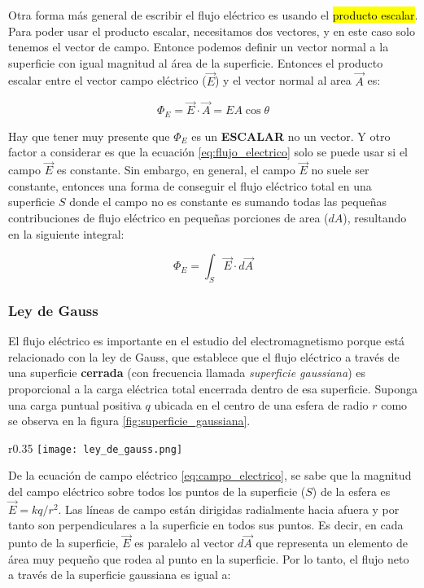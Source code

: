 Otra forma más general de escribir el flujo eléctrico es usando el \hl{producto escalar}. Para poder usar el producto escalar, necesitamos dos vectores, y en este caso solo tenemos el vector de campo. Entonce podemos definir un vector normal a la superficie con igual magnitud al área de la superficie. Entonces el producto escalar entre el vector campo eléctrico (\(\vec{E}\)) y el vector normal al area \(\vec{A}\) es:

\begin{equation}
    \Phi_E = \vec{E} \cdot \vec{A} = E A \cos \theta
    \label{eq:flujo_electrico}
\end{equation}

Hay que tener muy presente que \(\Phi_E\) es un \textbf{ESCALAR} no un vector. Y otro factor a considerar es que la ecuación \eqref{eq:flujo_electrico} solo se puede usar si el campo \(\vec{E}\) es constante. Sin embargo, en general, el campo \(\vec{E}\) no suele ser constante, entonces una forma de conseguir el flujo eléctrico total en una superficie \(S\) donde el campo no es constante es sumando todas las pequeñas contribuciones de flujo eléctrico en pequeñas porciones de area (\(dA\)), resultando en la siguiente integral:

\begin{equation}
    \Phi_E = \int_{S} \vec{E} \cdot d\vec{A}
    \label{eq:flujo_electrico_integral}
\end{equation}

\subsubsection{Ley de Gauss}
\label{sec:ley_de_gauss}

El flujo eléctrico es importante en el estudio del electromagnetismo porque está relacionado con la ley de Gauss, que establece que el flujo eléctrico a través de una superficie \textbf{cerrada} (con frecuencia llamada \textit{superficie gaussiana}) es proporcional a la carga eléctrica total encerrada dentro de esa superficie. Suponga una carga puntual positiva \(q\) ubicada en el centro de una esfera de radio \(r\) como se observa en la figura \ref{fig:superficie_gaussiana}.

\begin{wrapfigure}{r}{0.35\textwidth}
    \centering
    \texttt{[image: ley\_de\_gauss.png]}
    \caption{Superficie gaussiana esférica de radio \(r\) que rodea una carga puntual \(q\).}
    \label{fig:superficie_gaussiana}
\end{wrapfigure}
De la ecuación de campo eléctrico \eqref{eq:campo_electrico}, se sabe que la magnitud del campo eléctrico sobre todos los puntos de la superficie (\(S\)) de la esfera es \(\vec{E} = k q/r^2\). Las líneas de campo están dirigidas radialmente hacia afuera y por tanto son perpendiculares a la superficie en todos sus puntos. Es decir, en cada punto de la superficie, \(\vec{E}\) es paralelo al vector \(d\vec{A}\) que representa un elemento de área muy pequeño que rodea al punto en la superficie. Por lo tanto, el flujo neto a través de la superficie gaussiana es igual a:

